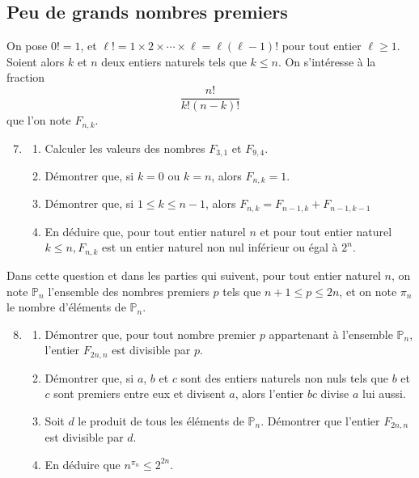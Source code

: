 \documentclass[landscape,twocolumn,leqno,a4paper,10pt]{report} %
\newcommand\n{\noindent}
\renewcommand{\geq}{\geqslant}
\renewcommand{\leq}{\leqslant}
\begin{document}
\subsection{Peu de grands nombres premiers}


\n On pose $0 !=1$, et $\ell !=1 \times 2 \times \cdots \times \ell=\ell(\ell-1) !$ pour tout entier $\ell \geq 1$. Soient alors $k$ et $n$ deux entiers naturels tels que $k \leq n$. On s'intéresse à la fraction
$$\frac{n !}{k !(n-k) !}$$
que l'on note $F_{n, k}$.

\begin{enumerate}\setcounter{enumi}{6}
	\item \begin{enumerate}
		\item Calculer les valeurs des nombres $F_{3,1}$ et $F_{9,4}$.
		\item Démontrer que, si $k=0$ ou $k=n$, alors $F_{n, k}=1$.
		\item Démontrer que, si $1 \leq k \leq n-1$, alors $F_{n, k}=F_{n-1, k}+F_{n-1, k-1}$
		\item En déduire que, pour tout entier naturel $n$ et pour tout entier naturel $k \leq n, F_{n, k}$ est un entier naturel non nul inférieur ou égal à $2^{n}$.
	\end{enumerate} 
\end{enumerate}

\n Dans cette question et dans les parties qui suivent, pour tout entier naturel $n$, on note $\mathbb{P}_{n}$ l'ensemble des nombres premiers $p$ tels que $n+1 \leq p \leq 2 n$, et on note $\pi_{n}$ le nombre d'éléments de $\mathbb{P}_{n}$.

\begin{enumerate}\setcounter{enumi}{7}
	\item \begin{enumerate}
		\item Démontrer que, pour tout nombre premier $p$ appartenant à l'ensemble $\mathbb{P}_{n}$, l'entier $F_{2 n, n}$ est divisible par $p$.
		\item Démontrer que, si $a$, $b$ et $c$ sont des entiers naturels non nuls tels que $b$ et $c$ sont premiers entre eux et divisent $a$, alors l'entier $b c$ divise $a$ lui aussi.
		\item Soit $d$ le produit de tous les éléments de $\mathbb{P}_{n}$. Démontrer que l'entier $F_{2 n, n}$ est divisible par $d$.
		\item En déduire que $n^{\pi_{n}} \leq 2^{2 n}$.
	\end{enumerate}
\end{enumerate}
\end{document}
